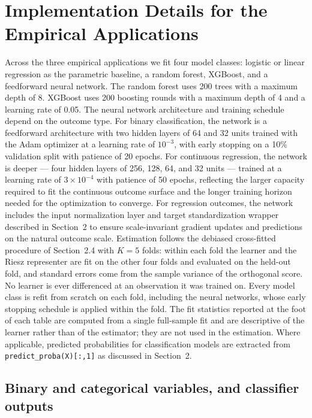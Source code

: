 \documentclass[12pt,a4paper]{article}
\numberwithin{equation}{section}
\theoremstyle{plain}
\theoremstyle{definition}
\begin{document}
	\section{Implementation Details for the Empirical Applications}
	\label{app:empirical_details}

	Across the three empirical applications we fit four model classes: logistic or linear regression as the parametric baseline, a random forest, XGBoost, and a feedforward neural network. The random forest uses 200 trees with a maximum depth of 8. XGBoost uses 200 boosting rounds with a maximum depth of 4 and a learning rate of 0.05. The neural network architecture and training schedule depend on the outcome type. For binary classification, the network is a feedforward architecture with two hidden layers of 64 and 32 units trained with the Adam optimizer at a learning rate of $10^{-3}$, with early stopping on a 10\% validation split with patience of 20 epochs. For continuous regression, the network is deeper --- four hidden layers of 256, 128, 64, and 32 units --- trained at a learning rate of $3 \times 10^{-4}$ with patience of 50 epochs, reflecting the larger capacity required to fit the continuous outcome surface and the longer training horizon needed for the optimization to converge. For regression outcomes, the network includes the input normalization layer and target standardization wrapper described in Section~2 to ensure scale-invariant gradient updates and predictions on the natural outcome scale. Estimation follows the debiased cross-fitted procedure of Section~2.4 with $K=5$ folds: within each fold the learner and the Riesz representer are fit on the other four folds and evaluated on the held-out fold, and standard errors come from the sample variance of the orthogonal score. No learner is ever differenced at an observation it was trained on. Every model class is refit from scratch on each fold, including the neural networks, whose early stopping schedule is applied within the fold. The fit statistics reported at the foot of each table are computed from a single full-sample fit and are descriptive of the learner rather than of the estimator; they are not used in the estimation. Where applicable, predicted probabilities for classification models are extracted from \texttt{predict\_proba(X)[:,1]} as discussed in Section~2.

	\subsection*{Binary and categorical variables, and classifier outputs}
\end{document}
